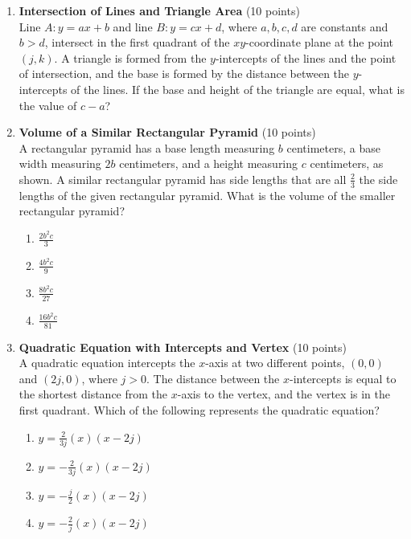 \begin{enumerate}
  \item \textbf{Intersection of Lines and Triangle Area} (10 points)\\
  Line $A: y=ax+b$ and line $B: y=cx+d$, where $a, b, c, d$ are constants and $b>d$, intersect in the first quadrant of the $xy$-coordinate plane at the point $(j, k)$. A triangle is formed from the $y$-intercepts of the lines and the point of intersection, and the base is formed by the distance between the $y$-intercepts of the lines. If the base and height of the triangle are equal, what is the value of $c-a$?
  \begin{subanswer}
  \end{subanswer}





  \newpage





  \item \textbf{Volume of a Similar Rectangular Pyramid} (10 points)\\
  A rectangular pyramid has a base length measuring $b$ centimeters, a base width measuring $2b$ centimeters, and a height measuring $c$ centimeters, as shown. A similar rectangular pyramid has side lengths that are all $\frac{2}{3}$ the side lengths of the given rectangular pyramid. What is the volume of the smaller rectangular pyramid?
  \begin{enumerate}[label=(\Alph*)]
    \item $\frac{2b^2c}{3}$
    \item $\frac{4b^2c}{9}$
    \item $\frac{8b^2c}{27}$
    \item $\frac{16b^2c}{81}$
  \end{enumerate}
  \begin{subanswer}
  \end{subanswer}

  



  \item \textbf{Quadratic Equation with Intercepts and Vertex} (10 points)\\
  A quadratic equation intercepts the $x$-axis at two different points, $(0,0)$ and $(2j, 0)$, where $j>0$. The distance between the $x$-intercepts is equal to the shortest distance from the $x$-axis to the vertex, and the vertex is in the first quadrant. Which of the following represents the quadratic equation?
  \begin{enumerate}[label=(\Alph*)]
    \item $y=\frac{2}{3j}(x)(x-2j)$
    \item $y=-\frac{2}{3j}(x)(x-2j)$
    \item $y=-\frac{j}{2}(x)(x-2j)$
    \item $y=-\frac{2}{j}(x)(x-2j)$
  \end{enumerate}
  \begin{subanswer}
  \end{subanswer}





\end{enumerate}
